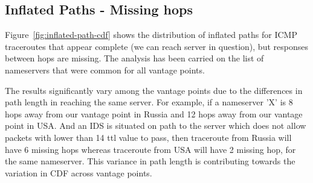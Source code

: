 \subsection{Inflated Paths - Missing hops}
Figure~\ref{fig:inflated-path-cdf} shows the distribution of inflated paths for ICMP traceroutes that appear complete (we can reach server in question), but responses between hops are missing. The analysis has been carried on the list of nameservers that were common for all vantage points.

The results significantly vary among the vantage points due to the differences in path length in reaching the same server. For example, if a nameserver 'X' is 8 hops away from our vantage point in Russia and 12 hops away from our vantage point in USA. And an IDS is situated on path to the server which does not allow packets with lower than 14 ttl value to pass, then traceroute from Russia  will have 6 missing hops whereas traceroute from USA will have 2 missing hop, for the same nameserver. This variance in path length is contributing towards the variation in CDF across vantage points.


\newpage

